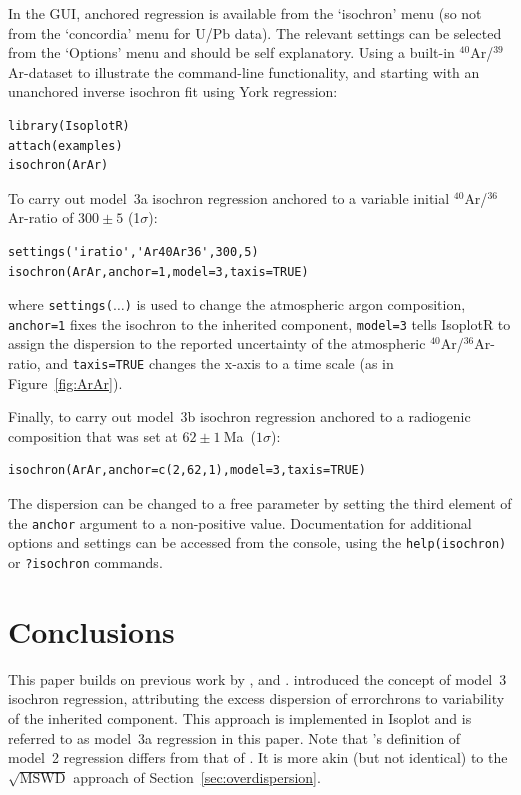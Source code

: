 \documentclass{article}
\begin{document}
In the GUI, anchored regression is available from the `isochron' menu
(so not from the `concordia' menu for U/Pb data). The relevant
settings can be selected from the `Options' menu and should be self
explanatory. Using a built-in ${}^{40}$Ar/${}^{39}$Ar-dataset to
illustrate the command-line functionality, and starting with an
unanchored inverse isochron fit using York regression:

\begin{verbatim}
library(IsoplotR)
attach(examples)
isochron(ArAr)
\end{verbatim}

To carry out model~3a isochron regression anchored to a variable
initial ${}^{40}$Ar/${}^{36}$Ar-ratio of $300\pm{5}$ (1$\sigma$):

\begin{verbatim}
settings('iratio','Ar40Ar36',300,5)
isochron(ArAr,anchor=1,model=3,taxis=TRUE)
\end{verbatim}

\noindent where \texttt{settings($\ldots$)} is used to change the
atmospheric argon composition, \texttt{anchor=1} fixes the isochron to
the inherited component, \texttt{model=3} tells IsoplotR to assign the
dispersion to the reported uncertainty of the atmospheric
${}^{40}$Ar/${}^{36}$Ar-ratio, and \texttt{taxis=TRUE} changes the
x-axis to a time scale (as in Figure~\ref{fig:ArAr}).\medskip

Finally, to carry out model~3b isochron regression anchored to a
radiogenic composition that was set at $62\pm{1}~$Ma~($1\sigma$):

\begin{verbatim}
isochron(ArAr,anchor=c(2,62,1),model=3,taxis=TRUE)
\end{verbatim}

The dispersion can be changed to a free parameter by setting the third
element of the \texttt{anchor} argument to a non-positive
value. Documentation for additional options and settings can be
accessed from the console, using the \verb|help(isochron)| or
\verb|?isochron| commands.

\section{Conclusions}\label{sec:conclusions}

This paper builds on previous work by \citet{mcintyre1966},
\citet{titterington1979} and \citet{ludwig2003}. \citet{mcintyre1966}
introduced the concept of model~3 isochron regression, attributing the
excess dispersion of errorchrons to variability of the inherited
component. This approach is implemented in Isoplot \citep{ludwig2003}
and is referred to as model~3a regression in this paper. Note that
\citet{mcintyre1966}'s definition of model~2 regression differs from
that of \citet{ludwig2003}. It is more akin (but not identical) to the
$\sqrt{\mbox{MSWD}}$ approach of
Section~\ref{sec:overdispersion}.\medskip
\end{document}

